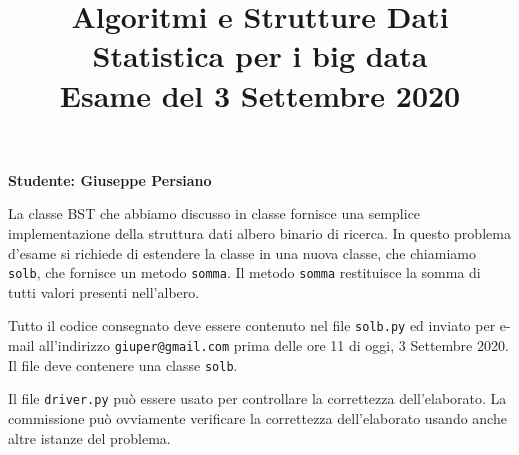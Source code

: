 \documentclass{amsart}
\begin{document}
\title{Algoritmi e Strutture Dati\\
Statistica per i big data\\
Esame del 3 Settembre 2020
}


\newcommand{\NomeStudente}{Giuseppe Persiano}
\newcommand{\nomeClasse}{solb}


\maketitle

\hfill{{\bf Studente: \NomeStudente}}

\smallskip
La classe BST che abbiamo discusso in classe fornisce una semplice 
implementazione della struttura dati albero binario di ricerca.
In questo problema d'esame si richiede di estendere la classe {}
in una nuova classe, che chiamiamo {\tt{\nomeClasse}}, che fornisce un metodo 
{\tt somma}. Il metodo {\tt somma} restituisce la somma di tutti
valori presenti nell’albero.


\medskip{}
Tutto il codice consegnato deve essere contenuto nel file
{\tt \nomeClasse .py} ed inviato per e-mail all'indirizzo
{\tt giuper@gmail.com} prima delle ore 11 di oggi, 3 Settembre 2020.
Il file deve contenere una classe {\tt \nomeClasse}.

Il file {\tt driver.py} pu\`o essere usato per controllare la correttezza
dell'elaborato. 
La commissione pu\`o ovviamente verificare la correttezza dell'elaborato
usando anche altre istanze del problema.
\end{document}
